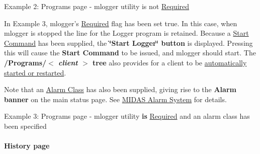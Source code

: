 \par
\par
\par
 \begin{center}  Example 2: Programs page -\/ mlogger utility is not \hyperlink{RC_mhttpd_Program_page_RC_mhttpd_Required}{Required} \par
\par
\par
   \end{center}  \par
\par
\par


In Example 3, mlogger's \hyperlink{RC_mhttpd_Program_page_RC_mhttpd_Required}{Required} flag has been set true. In this case, when mlogger is stopped the line for the Logger program is retained. Because a \hyperlink{RC_customize_ODB_RC_programs_Start_command}{Start Command} has been supplied, the {\bfseries \char`\"{}Start Logger\char`\"{} button} is displayed. Pressing this will cause the {\bfseries Start Command} to be issued, and mlogger should start. The {\bfseries  /Programs/$<$ {\itshape client\/} $>$ tree } also provides for a client to be \hyperlink{RC_customize_ODB_RC_customize_Programs_tree}{automatically started or restarted}.

Note that an \hyperlink{RC_customize_ODB_RC_programs_Alarm_class}{Alarm Class} has also been supplied, giving rise to the {\bfseries Alarm banner} on the main status page. See \hyperlink{RC_customize_ODB_RC_Alarm_System}{MIDAS Alarm System} for details.

\par
\par
\par
\begin{center}  Example 3: Programs page -\/ mlogger utility {\bfseries is} \hyperlink{RC_customize_ODB_RC_programs_Required}{Required} and an alarm class has been specified \par
\par
\par
  \end{center}  \par
\par
\par


\par




\par
 \label{index_end}
\hypertarget{index_end}{}
 \paragraph{History page}\label{RC_mhttpd_History_page}
\label{RC_mhttpd_History_page_idx_mhttpd_page_history}
\hypertarget{RC_mhttpd_History_page_idx_mhttpd_page_history}{}
 \par




